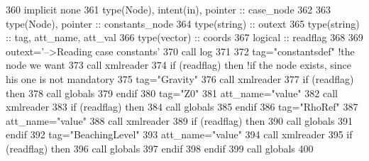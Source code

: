 \begin{DoxyCode}
360     \textcolor{keywordtype}{implicit none}
361     \textcolor{keywordtype}{type}(Node), \textcolor{keywordtype}{intent(in)}, \textcolor{keywordtype}{pointer} :: case\_node
362 
363     \textcolor{keywordtype}{type}(Node), \textcolor{keywordtype}{pointer} :: constants\_node
364     \textcolor{keywordtype}{type}(string) :: outext
365     \textcolor{keywordtype}{type}(string) :: tag, att\_name, att\_val
366     \textcolor{keywordtype}{type}(vector) :: coords
367     \textcolor{keywordtype}{logical} :: readflag
368 
369     outext=\textcolor{stringliteral}{'-->Reading case constants'}
370     \textcolor{keyword}{call }log%
371 
372     tag=\textcolor{stringliteral}{"constantsdef"}    \textcolor{comment}{!the node we want}
373     \textcolor{keyword}{call }xmlreader%
374     \textcolor{keywordflow}{if} (readflag) \textcolor{keywordflow}{then} \textcolor{comment}{!if the node exists, since his one is not mandatory}
375         tag=\textcolor{stringliteral}{"Gravity"}
376         \textcolor{keyword}{call }xmlreader%
377         \textcolor{keywordflow}{if} (readflag) \textcolor{keywordflow}{then}
378             \textcolor{keyword}{call }globals%
379 \textcolor{keywordflow}{        endif}
380         tag=\textcolor{stringliteral}{"Z0"}
381         att\_name=\textcolor{stringliteral}{"value"}
382         \textcolor{keyword}{call }xmlreader%
383         \textcolor{keywordflow}{if} (readflag) \textcolor{keywordflow}{then}
384             \textcolor{keyword}{call }globals%
385 \textcolor{keywordflow}{        endif}
386         tag=\textcolor{stringliteral}{"RhoRef"}
387         att\_name=\textcolor{stringliteral}{"value"}
388         \textcolor{keyword}{call }xmlreader%
389         \textcolor{keywordflow}{if} (readflag) \textcolor{keywordflow}{then}
390             \textcolor{keyword}{call }globals%
391 \textcolor{keywordflow}{        endif}
392         tag=\textcolor{stringliteral}{"BeachingLevel"}
393         att\_name=\textcolor{stringliteral}{"value"}
394         \textcolor{keyword}{call }xmlreader%
395         \textcolor{keywordflow}{if} (readflag) \textcolor{keywordflow}{then}
396             \textcolor{keyword}{call }globals%
397 \textcolor{keywordflow}{        endif}
398 \textcolor{keywordflow}{    endif}
399     \textcolor{keyword}{call }globals%
400 
\end{DoxyCode}
